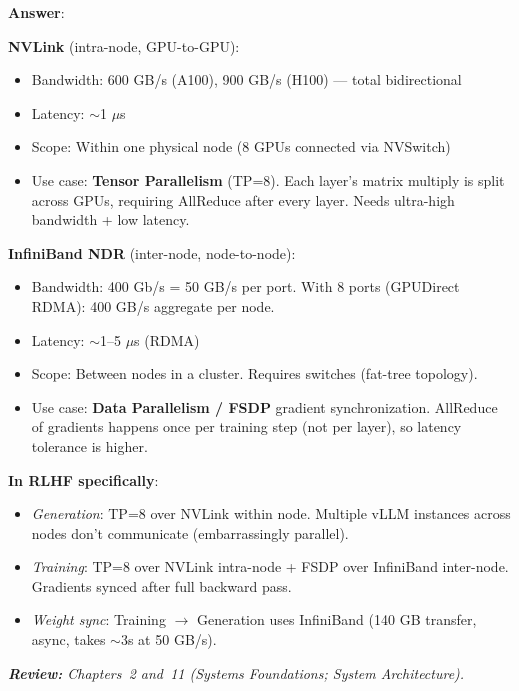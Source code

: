 \begin{questionbox}
\textbf{Answer}:

\textbf{NVLink} (intra-node, GPU-to-GPU):

\begin{itemize}
  \item Bandwidth: 600 GB/s (A100), 900 GB/s (H100) --- total bidirectional
  \item Latency: $\sim$1 $\mu$s
  \item Scope: Within one physical node (8 GPUs connected via NVSwitch)
  \item Use case: \textbf{Tensor Parallelism} (TP=8). Each layer’s matrix multiply is split across GPUs, requiring AllReduce after every layer. Needs ultra-high bandwidth + low latency.
\end{itemize}

\textbf{InfiniBand NDR} (inter-node, node-to-node):

\begin{itemize}
  \item Bandwidth: 400 Gb/s = 50 GB/s per port. With 8 ports (GPUDirect RDMA): 400 GB/s aggregate per node.
  \item Latency: $\sim$1--5 $\mu$s (RDMA)
  \item Scope: Between nodes in a cluster. Requires switches (fat-tree topology).
  \item Use case: \textbf{Data Parallelism / FSDP} gradient synchronization. AllReduce of gradients happens once per training step (not per layer), so latency tolerance is higher.
\end{itemize}

\textbf{In RLHF specifically}:

\begin{itemize}
  \item \emph{Generation}: TP=8 over NVLink within node. Multiple vLLM instances across nodes don’t communicate (embarrassingly parallel).
  \item \emph{Training}: TP=8 over NVLink intra-node + FSDP over InfiniBand inter-node. Gradients synced after full backward pass.
  \item \emph{Weight sync}: Training $\to$ Generation uses InfiniBand (140 GB transfer, async, takes $\sim$3s at 50 GB/s).
\end{itemize}

\emph{\textbf{Review:} Chapters~2 and~11 (Systems Foundations; System Architecture).}
\end{questionbox}

